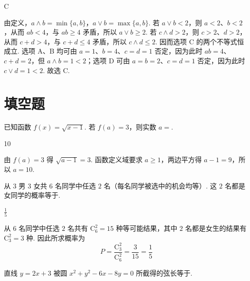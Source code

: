 \begin{answer}
C
\end{answer}

\begin{solution}
由定义，\(a\wedge b=\min\{a,b\}\)，\(a\vee b=\max\{a,b\}\). 若 \(a\vee b<2\)，则 \(a<2\)、\(b<2\)，从而 \(ab<4\)，与 \(ab\geqslant4\) 矛盾，所以 \(a\vee b\geqslant2\). 若 \(c\wedge d>2\)，则 \(c>2\)、\(d>2\)，从而 \(c+d>4\)，与 \(c+d\leqslant4\) 矛盾，所以 \(c\wedge d\leqslant2\). 因而选项 C 的两个不等式恒成立. 选项 A、B 均可由 \(a=1\)、\(b=4\)、\(c=d=1\) 否定，因为此时 \(ab=4\)、\(c+d=2\)，但 \(a\wedge b=1<2\)；选项 D 可由 \(a=b=2\)、\(c=d=1\) 否定，因为此时 \(c\vee d=1<2\). 故选 C.
\end{solution}

\section{填空题}

\begin{problem}
已知函数 \( f(x) = \sqrt{x - 1} \). 若 \( f(a) = 3 \)，则实数 \( a = \)\fillinblank{}.
\end{problem}

\begin{answer}
10
\end{answer}

\begin{solution}
由 \(f(a)=3\) 得 \(\sqrt{a-1}=3\). 函数定义域要求 \(a\geqslant1\)，两边平方得 \(a-1=9\)，所以 \(a=10\).
\end{solution}

\begin{problem}
从 \(3\) 男 \(3\) 女共 \(6\) 名同学中任选 \(2\) 名（每名同学被选中的机会均等）. 这 \(2\) 名都是女同学的概率等于\fillinblank{}.
\end{problem}

\begin{answer}
\(\frac{1}{5}\)
\end{answer}

\begin{solution}
从 \(6\) 名同学中任选 \(2\) 名共有 \(\mathrm C_6^2=15\) 种等可能结果，其中 \(2\) 名都是女生的结果有 \(\mathrm C_3^2=3\) 种. 因此所求概率为
\[
P=\frac{\mathrm C_3^2}{\mathrm C_6^2}=\frac{3}{15}=\frac{1}{5}
\]
\end{solution}

\begin{problem}
直线 \( y = 2x + 3 \) 被圆 \( x^{2} + y^{2} - 6x - 8y = 0 \) 所截得的弦长等于\fillinblank{}.
\end{problem}


